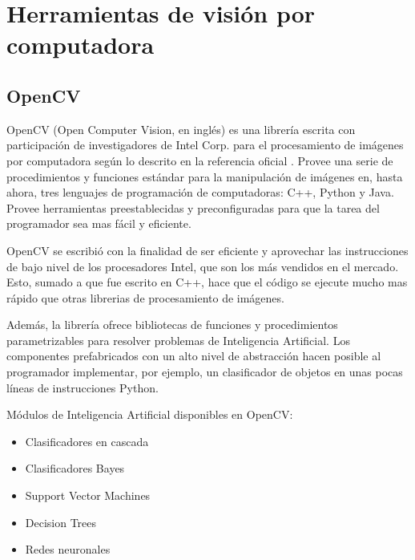 \documentclass[a4paper,12pt,twoside]{article}
\begin{document}
\section{Herramientas de visión por computadora}

\subsection{OpenCV}

OpenCV (Open Computer Vision, en inglés) es una librería escrita con participación de investigadores de Intel Corp. para el procesamiento de imágenes por computadora según lo descrito en la referencia oficial \cite{opencv1}. Provee una serie de procedimientos y funciones estándar para la manipulación de imágenes en, hasta ahora, tres lenguajes de programación de computadoras: C++,  Python y Java. Provee herramientas preestablecidas y preconfiguradas para que la tarea del programador sea mas fácil y eficiente. \par

OpenCV se escribió con la finalidad de ser eficiente y aprovechar las instrucciones de bajo nivel de los procesadores Intel, que son los más vendidos en el mercado. Esto, sumado a que fue escrito en C++, hace que el código se ejecute mucho mas rápido que otras librerias de procesamiento de imágenes.\par

Además, la librería ofrece bibliotecas de funciones y procedimientos parametrizables para resolver problemas de Inteligencia Artificial. Los componentes prefabricados con un alto nivel de abstracción hacen posible al programador implementar, por ejemplo, un clasificador de objetos en unas pocas líneas de instrucciones Python.\par

Módulos de Inteligencia Artificial disponibles en OpenCV:
\begin{itemize}
	\item Clasificadores en cascada\\	
	\item Clasificadores Bayes\\	
	\item Support Vector Machines\\	
	\item Decision Trees \\	
	\item Redes neuronales \\	
\end{itemize}
\end{document}
